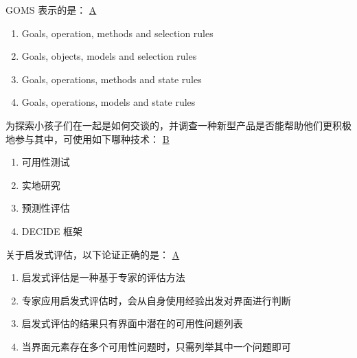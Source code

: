 \begin{problem}
	GOMS 表示的是：
	\uline{A}    
    \vspace{-0.8em}
    \begin{multicols}{2}
        \begin{enumerate}[label=\Alph*.]
            \item  Goals, operation, methods and selection rules
            \item  Goals, objects, models and selection rules
            \item  Goals, operations, methods and state rules
            \item  Goals, operations, models and state rules
        \end{enumerate}
    \end{multicols}
    \vspace{-1em}
\end{problem}



\begin{problem}
	为探索小孩子们在一起是如何交谈的，并调查一种新型产品是否能帮助他们更积极地参与其中，可使用如下哪种技术：
	\uline{B}    
    \vspace{-0.8em}
    \begin{multicols}{4}
        \begin{enumerate}[label=\Alph*.]
            \item 可用性测试
            \item 实地研究
            \item 预测性评估
            \item DECIDE 框架
        \end{enumerate}
    \end{multicols}
    \vspace{-1em}
\end{problem}



\begin{problem}
	关于启发式评估，以下论证正确的是：
	\uline{A}    
    \begin{enumerate}[label=\Alph*.]
        \item 启发式评估是一种基于专家的评估方法
        \item 专家应用启发式评估时，会从自身使用经验出发对界面进行判断
        \item 启发式评估的结果只有界面中潜在的可用性问题列表
        \item 当界面元素存在多个可用性问题时，只需列举其中一个问题即可
    \end{enumerate}
\end{problem}

